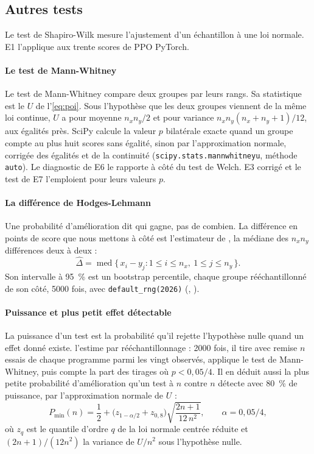 \subsection{Autres tests}\label{sec:autres-tests}
Le test de Shapiro-Wilk \parencite{shapiro1965analysis} mesure l'ajustement d'un échantillon à une loi normale.
E1 l'applique aux trente scores de PPO PyTorch.

\paragraph{Le test de Mann-Whitney}
Le test de Mann-Whitney \parencite{mann1947test} compare deux groupes par leurs rangs. Sa statistique est le $U$
de l'\cref{eq:poi}. Sous l'hypothèse que les deux groupes viennent de la même loi continue, $U$ a pour moyenne
$n_xn_y/2$ et pour variance $n_xn_y(n_x+n_y+1)/12$, aux égalités près. SciPy calcule la valeur $p$ bilatérale
exacte quand un groupe compte au plus huit scores sans égalité, sinon par l'approximation normale, corrigée des
égalités et de la continuité (\texttt{scipy.stats.mannwhitneyu}, méthode \texttt{auto}). Le diagnostic de E6 le
rapporte à côté du test de Welch. E3 corrigé et le test de E7 l'emploient pour leurs valeurs $p$.

\paragraph{La différence de Hodges-Lehmann}
Une probabilité d'amélioration dit qui gagne, pas de combien. La différence en points de score que nous mettons à
côté est l'estimateur de \textcite{hodges1963estimates}, la médiane des $n_xn_y$ différences deux à deux :
\begin{equation}\label{eq:hl}
  \hat\Delta=\operatorname{med}\{\,x_i-y_j : 1\le i\le n_x,\ 1\le j\le n_y\,\}.
\end{equation}
Son intervalle à 95~\% est un bootstrap percentile, chaque groupe rééchantillonné de son côté, \num{5000} fois,
avec \texttt{default\_rng(2026)} (, ).

\paragraph{Puissance et plus petit effet détectable}
La puissance d'un test est la probabilité qu'il rejette l'hypothèse nulle quand un effet donné existe.
 l'estime par rééchantillonnage : \num{2000} fois, il tire avec remise $n$ essais de chaque
programme parmi les vingt observés, applique le test de Mann-Whitney, puis compte la part des tirages où
$p<0{,}05/4$. Il en déduit aussi la plus petite probabilité d'amélioration qu'un test à $n$ contre $n$ détecte
avec 80~\% de puissance, par l'approximation normale de $U$ :
\begin{equation}\label{eq:mde}
  P_{\min}(n)=\frac12+\bigl(z_{1-\alpha/2}+z_{0{,}8}\bigr)\sqrt{\frac{2n+1}{12\,n^2}},\qquad
  \alpha=0{,}05/4,
\end{equation}
où $z_q$ est le quantile d'ordre $q$ de la loi normale centrée réduite et $(2n+1)/(12n^2)$ la variance de
$U/n^2$ sous l'hypothèse nulle.

